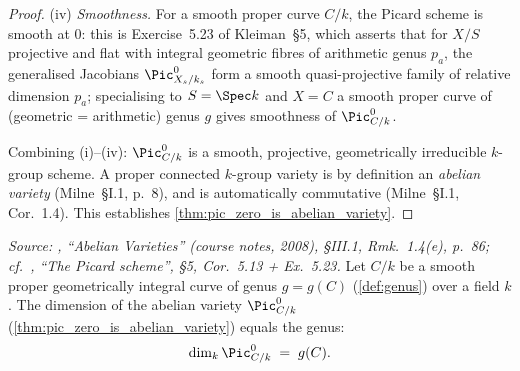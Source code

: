 \begin{proof}
  (iv) \emph{Smoothness.} For a smooth proper curve \(C/k\), the
  Picard scheme is smooth at \(0\): this is Exercise~5.23 of
  Kleiman~\S 5, which asserts that for \(X/S\) projective and flat
  with integral geometric fibres of arithmetic genus \(p_a\), the
  generalised Jacobians \(\Pic^0_{X_s/k_s}\) form a smooth
  quasi-projective family of relative dimension \(p_a\); specialising
  to \(S = \Spec k\) and \(X = C\) a smooth proper curve of (geometric
  = arithmetic) genus \(g\) gives smoothness of \(\Pic^0_{C/k}\).

  Combining (i)--(iv): \(\Pic^0_{C/k}\) is a smooth, projective,
  geometrically irreducible \(k\)-group scheme. A proper connected
  \(k\)-group variety is by definition an \emph{abelian variety}
  (Milne~\S I.1, p.~8), and is automatically commutative (Milne~\S I.1,
  Cor.~1.4). This establishes
  \cref{thm:pic_zero_is_abelian_variety}.
\end{proof}

\begin{theorem}\leanok
  \label{thm:pic_zero_dimension_equals_genus}

  \textit{Source: \cite{milne-av}, ``Abelian Varieties'' (course notes, 2008),
  \S III.1, Rmk.~1.4(e), p.~86; cf.\ \cite{kleiman-picard}, ``The Picard scheme'',
  \S 5, Cor.~5.13 + Ex.~5.23.}
  Let \(C/k\) be a smooth proper geometrically integral curve of genus
  \(g = g(C)\) (\cref{def:genus}) over a field \(k\). The dimension of
  the abelian variety \(\Pic^0_{C/k}\)
  (\cref{thm:pic_zero_is_abelian_variety}) equals the genus:
  \[
    \dim_k \Pic^0_{C/k} \;=\; g(C).
  \]
\end{theorem}

